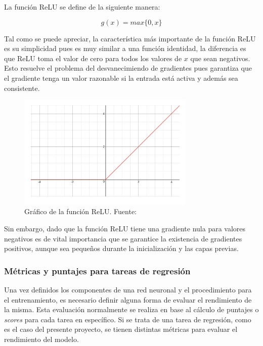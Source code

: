             La función ReLU se define de la siguiente manera:

            \begin{equation}\label{eq:relu}
                g(x) = max\{0,x\}
            \end{equation}

            Tal como se puede apreciar, la característica más importante de la función ReLU es su simplicidad pues es muy 
            similar a una función identidad, la diferencia es que ReLU toma el valor de cero para todos los valores de $x$ que 
            sean negativos. Esto resuelve el problema del desvanecimiendo de gradientes pues garantiza que el gradiente 
            tenga un valor razonable si la entrada está activa y además sea consistente.

            \begin{figure}[!h] 
                \centering
                \includegraphics[width=0.75\textwidth]{img/relu}
                \caption[Gráfico de la función ReLU]{Gráfico de la función ReLU. Fuente: \cite{wang_2016} }
                \label{fig:relu}
            \end{figure}

            Sin embargo, dado que la función ReLU tiene una gradiente nula para valores negativos es de vital importancia 
            que se garantice la existencia de gradientes positivos, aunque sea pequeños durante la inicialización y las capas 
            previas.

        
        \subsubsection{Métricas y puntajes para tareas de regresión}
        Una vez definidos los componentes de una red neuronal y el procedimiento para el entrenamiento, es necesario 
        definir alguna forma de evaluar el rendimiento de la misma. Esta evaluación normalmente se realiza en base al 
        cálculo de puntajes o \textit{scores} para cada tarea en específico. Si se trata de una tarea de regresión, como 
        es el caso del presente proyecto, se tienen distintas métricas para evaluar el rendimiento del modelo.

